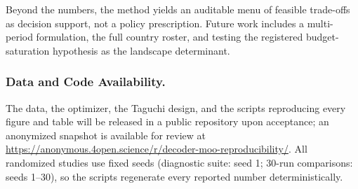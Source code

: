 \documentclass[runningheads]{llncs}
\begin{document}
Beyond the numbers, the method yields an auditable menu of feasible trade-offs as decision support, not a policy prescription. Future work includes a multi-period formulation, the full country roster, and testing the registered budget-saturation hypothesis as the landscape determinant.

\subsubsection*{Data and Code Availability.}
The data, the optimizer, the Taguchi design, and the scripts reproducing every figure and table will be released in a public repository upon acceptance; an anonymized snapshot is available for review at \url{https://anonymous.4open.science/r/decoder-moo-reproducibility/}. All randomized studies use fixed seeds (diagnostic suite: seed 1; 30-run comparisons: seeds 1--30), so the scripts regenerate every reported number deterministically.
\end{document}
